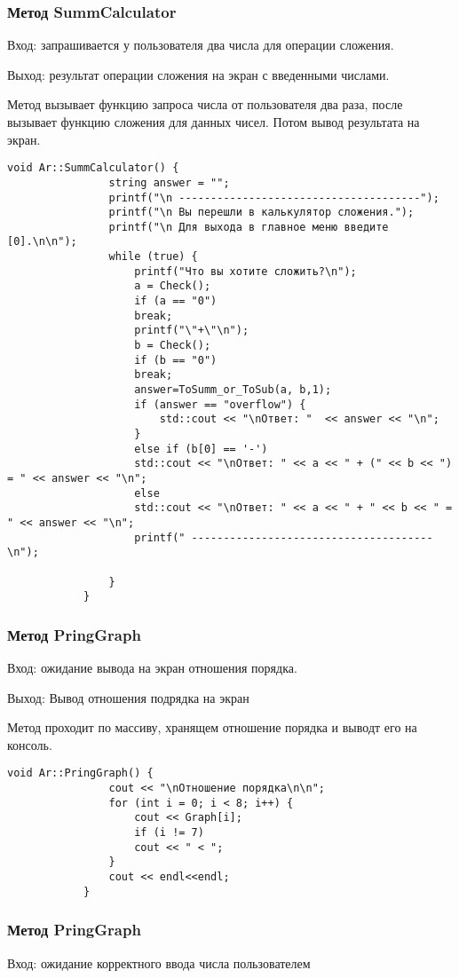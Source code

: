 \documentclass[10pt,a4paper,final]{article} %
\begin{document}
		\subsubsection{Метод SummCalculator}
		Вход: запрашивается у пользователя два числа для операции сложения. 
		
		Выход: результат операции сложения на экран с введенными числами.
		
		Метод вызывает функцию запроса числа от пользователя два раза, после вызывает функцию сложения для данных чисел. Потом вывод результата на экран.  
		
		\begin{lstlisting}[caption={Метод SummCalculator}]
			void Ar::SummCalculator() {
				string answer = "";
				printf("\n --------------------------------------");
				printf("\n Вы перешли в калькулятор сложения.");
				printf("\n Для выхода в главное меню введите [0].\n\n");
				while (true) {
					printf("Что вы хотите сложить?\n");
					a = Check();
					if (a == "0")
					break;
					printf("\"+\"\n");
					b = Check();
					if (b == "0")
					break;
					answer=ToSumm_or_ToSub(a, b,1);
					if (answer == "overflow") {
						std::cout << "\nОтвет: "  << answer << "\n";
					}
					else if (b[0] == '-')
					std::cout << "\nОтвет: " << a << " + (" << b << ") = " << answer << "\n";
					else
					std::cout << "\nОтвет: " << a << " + " << b << " = " << answer << "\n";
					printf(" --------------------------------------\n");
					
				}
			}
		\end{lstlisting}
		
			\subsubsection{Метод PringGraph}
		Вход: ожидание вывода на экран отношения порядка. 
		
		Выход: Вывод отношения подрядка на экран
		
		Метод проходит по массиву, хранящем отношение порядка и выводт его на консоль.
		
		\begin{lstlisting}[caption={Метод PringGraph}]
			void Ar::PringGraph() {
				cout << "\nОтношение порядка\n\n";
				for (int i = 0; i < 8; i++) {
					cout << Graph[i];
					if (i != 7)
					cout << " < ";
				}
				cout << endl<<endl;
			}
		\end{lstlisting}
		
			\subsubsection{Метод PringGraph}
			Вход: ожидание корректного ввода числа пользователем
			
\end{document}
